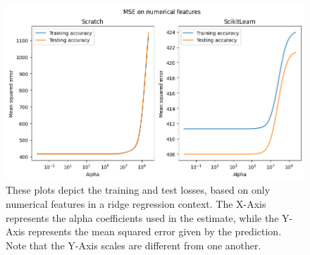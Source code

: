 \documentclass{article}
\begin{document}
    
\begin{figure}[H]
	\begin{adjustwidth}{0 cm}{}
		\begin{center}
			\includegraphics[scale= 0.6]{images/MSE_numerical_vs.png}
		\end{center}
	\end{adjustwidth}
	\caption{These plots depict the training and test losses, based on only numerical features in a ridge regression context. The X-Axis represents the alpha coefficients used in the estimate, while the Y-Axis represents the mean squared error given by the prediction. Note that the Y-Axis scales are different from one another.}
	\label{rrmsenun}
\end{figure}
    
\end{document}
